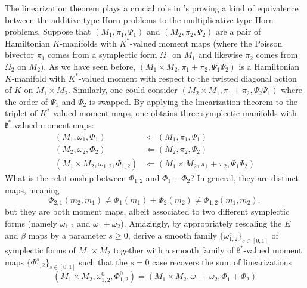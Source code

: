 \documentclass[notitlepage]{article}
\begin{document}
The linearization theorem plays a crucial role in \citeauthor{alekseev2001linearization}'s proving a kind of equivalence between the additive-type Horn problems to the multiplicative-type Horn problems. 
Suppose that $(M_1, \pi_1, \Psi_1)$ and $(M_2, \pi_2, \Psi_2)$ are a pair of Hamiltonian $K$-manifolds with $K^{*}$-valued moment maps (where the Poisson bivector $\pi_1$ comes from a symplectic form $\Omega_1$ on $M_1$ and likewise $\pi_2$ comes from $\Omega_2$ on $M_2)$.
As we have seen before, $(M_1 \times M_2, \pi_1 + \pi_2, \Psi_1 \Psi_2)$ is a Hamiltonian $K$-manifold with $K^{*}$-valued moment with respect to the twisted diagonal action of $K$ on $M_1 \times M_2$.
Similarly, one could consider $(M_2 \times M_1, \pi_1 + \pi_2, \Psi_2\Psi_1 )$ where the order of $\Psi_1$ and $\Psi_2$ is swapped.
By applying the linearization theorem to the triplet of $K^{*}$-valued moment maps, one obtains three symplectic manifolds with $\mathfrak k^{*}$-valued moment maps:
\begin{align}
    (M_1, \omega_1, \Phi_1) &\Longleftarrow (M_1, \pi_1, \Psi_1) \\
    (M_2, \omega_2, \Phi_2) &\Longleftarrow (M_2, \pi_2, \Psi_2) \\
    (M_1 \times M_2, \omega_{1,2}, \Phi_{1,2}) &\Longleftarrow (M_1 \times M_2, \pi_1 + \pi_2, \Psi_1\Psi_2) 
\end{align}
What is the relationship between $\Phi_{1,2}$ and $\Phi_{1} + \Phi_{2}$? In general, they are distinct maps, meaning
\begin{equation}
    \Phi_{2,1} (m_2, m_1) \neq \Phi_1(m_1) + \Phi_2(m_2) \neq \Phi_{1,2} (m_1, m_2),
\end{equation}
but they are both moment maps, albeit associated to two different symplectic forms (namely $\omega_{1,2}$ and $\omega_1 + \omega_2$).
Amazingly, by appropriately rescaling the $E$ and $\beta$ maps by a parameter $s \geq 0$,
\citeauthor{alekseev2001linearization} \cite{alekseev2001linearization} derive a smooth family $\{\omega^{s}_{1,2}\}_{s \in [0,1]}$ of symplectic forms of $M_1 \times M_2$ together with a smooth family of $\mathfrak k^{*}$-valued moment maps $\{\Phi_{1,2}^{s}\}_{s\in[0,1]}$ such that the $s=0$ case recovers the sum of linearizations 
\begin{equation}
    (M_1\times M_2, \omega^{0}_{1,2}, \Phi^{0}_{1,2}) = (M_1 \times M_2, \omega_{1} + \omega_{2}, \Phi_1 + \Phi_2)
\end{equation}
\end{document}

